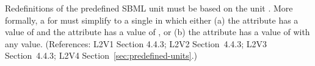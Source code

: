 Redefinitions of the predefined SBML unit  must be based on
the unit
.  More formally, a \UnitDefinition for  must
simplify to a single \Unit in which either (a) the 
attribute has a value of  and the 
attribute has a value of , or (b) the 
attribute has a value of  with any
 value.  (References: L2V1 Section 4.4.3; L2V2
Section~4.4.3; L2V3 Section~4.4.3; L2V4 Section~\ref{sec:predefined-units}.)
